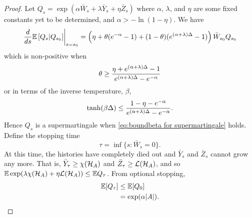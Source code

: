 \begin{proof}
		Let $Q_s = \exp \left(\alpha \bar{W}_s + \lambda \bar{Y}_s + \eta \bar{Z}_s\right)$ where $\alpha$, $\lambda$, and $\eta$ are some fixed constants yet to be determined, and $\alpha > -\ln(1 - \eta)$. 
		We have
		\begin{equation}
			\label{eq:martingalederivative}
			\left.\frac{d}{ds} \mathbb{E}\left[Q_{s} | Q_{s_0}\right] \right|_{s = s_0} = \left(\eta + \theta (e^{-\alpha} - 1) + (1 - \theta)(e^{(\alpha + \lambda)\Delta} - 1)\right)\bar{W}_{s_0} Q_{s_0}
		\end{equation}
		which is non-positive when
		\begin{equation}
			\theta \geq \frac{\eta + e^{(\alpha + \lambda)\Delta} - 1}{e^{(\alpha + \lambda)\Delta} - e^{-\alpha}}
		\end{equation}
		or in terms of the inverse temperature, $\beta$, 
		\begin{equation}
			\label{eq:boundbeta for supermartingale}
			\tanh(\beta\Delta) \leq \frac{1 - \eta - e^{-\alpha}}{e^{(\alpha+\lambda)\Delta} - e^{-\alpha}}.
		\end{equation}
		Hence $Q_s$ is a supermartingale when \eqref{eq:boundbeta for supermartingale} holds.
		Define the stopping time 
		\begin{equation}
			\tau = \inf\{s: \bar{W}_s = 0\}.
		\end{equation}
		At this time, the histories have completely died out and $\bar{Y}_s$ and $\bar{Z}_s$ cannot grow any more. That is, $\bar{Y}_\tau \geq \chi(\mathcal{H}_A)$ and $\bar{Z}_\tau \geq \mathcal{L}(\mathcal{H}_A)$, and so $\mathbb{E}\exp(\lambda \chi(\mathcal{H}_A) + \eta \mathcal{L}(\mathcal{H}_A)) \leq \mathbb{E} Q_\tau$. From optional stopping,
		\begin{align}
			\mathbb{E}[Q_\tau] &\leq \mathbb{E}[Q_{0}]\\
			&= \exp(\alpha |A|).
		\end{align}
	\end{proof}